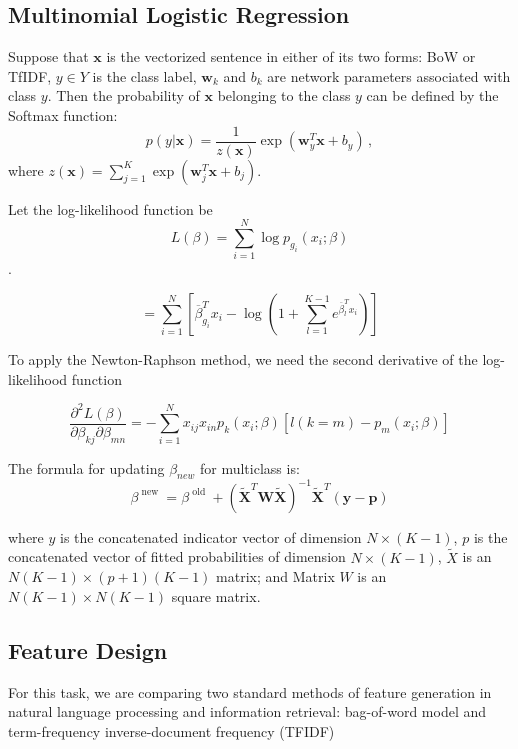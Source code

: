 \subsection{Multinomial Logistic Regression}
Suppose that $\mathbf{x}$ is the vectorized sentence in either of its two forms: BoW or TfIDF, $y\in Y$ is the class label, $\mathbf{w}_k$ and $b_k$ are network parameters associated with class $y$. Then the probability of $\mathbf{x}$ belonging to the class $y$ can be defined by the Softmax function:
\begin{equation}
p(y|\mathbf{x}) =\frac{1}{z(\mathbf{x})}\exp(\mathbf{w}_y^T\mathbf{x}+b_y) \,,
\label{eq:softmax}
\end{equation}
where $z(\mathbf{x}) = \sum_{j=1}^{K}\exp(\mathbf{w}_j^T\mathbf{x}+b_j)$.

Let the log-likelihood function be $$L ( \beta ) = \sum _ { i = 1 } ^ { N } \log p _ { g _ { i } } \left( x _ { i } ; \beta \right)$$. 

$$= \sum _ { i = 1 } ^ { N } \left[ \overline { \beta } _ { g _ { i } } ^ { T } x _ { i } - \log \left( 1 + \sum _ { l = 1 } ^ { K - 1 } e ^ { \overline { \beta } _ { l } ^ { T } x _ { i } } \right) \right]$$

To apply the Newton-Raphson method, we need the second derivative of the log-likelihood function

$$\frac { \partial ^ { 2 } L ( \beta ) } { \partial \beta _ { k j } \partial \beta _ { m n } } = - \sum _ { i = 1 } ^ { N } x _ { i j } x _ { i n } p _ { k } \left( x _ { i } ; \beta \right) \left[ l ( k = m ) - p _ { m } \left( x _ { i } ; \beta \right) \right]$$

The formula for updating $\beta_{new}$ for multiclass is:
$$\beta ^ { \text { new } } = \beta ^ { \text { old } } + \left( \tilde { \mathbf { X } } ^ { T } \mathbf { W } \tilde { \mathbf { X } } \right) ^ { - 1 } \tilde { \mathbf { X } } ^ { T } ( \mathbf { y } - \mathbf { p } )$$

where $y$ is the concatenated indicator vector of dimension $N \times (K-1)$, $p$ is the concatenated vector of fitted probabilities of dimension $N \times (K-1)$, $\tilde{X}$ is an $N(K-1)\times (p+1)(K-1)$ matrix; and Matrix $W$ is an $N(K-1)\times N(K-1)$ square matrix.

\subsection{Feature Design}

For this task, we are comparing two standard methods of feature generation in natural language processing and information retrieval: bag-of-word model and term-frequency inverse-document frequency (TFIDF)

